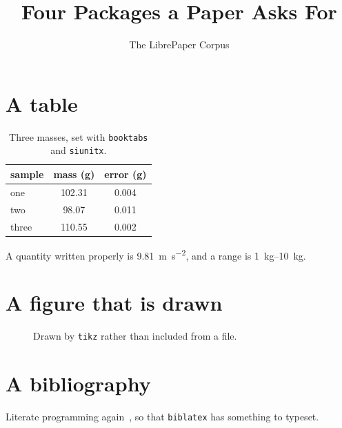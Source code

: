 \documentclass[11pt]{article}
\title{Four Packages a Paper Asks For}
\author{The LibrePaper Corpus}
\date{}
\begin{document}
\maketitle

\section{A table}

\begin{table}[h]
  \centering
  \begin{tabular}{lS[table-format=3.2]S[table-format=1.3]}
    \toprule
    sample & {mass (\si{\gram})} & {error (\si{\gram})} \\
    \midrule
    one   & 102.31 & 0.004 \\
    two   &  98.07 & 0.011 \\
    three & 110.55 & 0.002 \\
    \bottomrule
  \end{tabular}
  \caption{Three masses, set with \texttt{booktabs} and \texttt{siunitx}.}
\end{table}

A quantity written properly is \SI{9.81}{\metre\per\second\squared}, and a
range is \SIrange{1}{10}{\kilo\gram}.

\section{A figure that is drawn}

\begin{figure}[h]
  \centering
  \caption{Drawn by \texttt{tikz} rather than included from a file.}
\end{figure}

\section{A bibliography}

Literate programming again~\cite{knuth1984}, so that \texttt{biblatex} has
something to typeset.

\printbibliography
\end{document}
